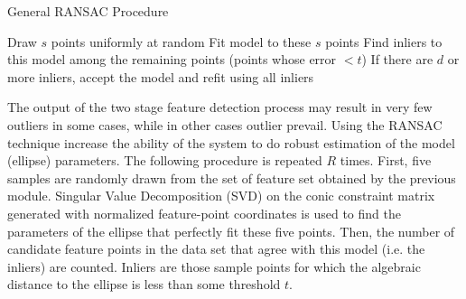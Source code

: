 \begin{algorithm}
\begin{dBox}
	\caption{General RANSAC Procedure} \label{ransac_outline}
	\begin{algorithmic}[1]
			\State Draw $s$ points uniformly at random
			\State Fit model to these $s$ points
			\State Find inliers to this model among the remaining points (points whose error $ < t$)
			\State If there are $d$ or more inliers, accept the model and refit using all inliers	
		\EndWhile	
		\EndProcedure	
	\end{algorithmic}
\end{dBox}	
\end{algorithm}


The output of the two stage feature detection process may result in very few outliers in some cases, while in other cases outlier prevail. Using the RANSAC technique increase the ability of the system to do robust estimation of the model (ellipse) parameters. The following procedure is repeated $R$ times. First, five samples are randomly drawn from the set of feature set obtained by the previous module.  Singular Value Decomposition (SVD) on the conic constraint matrix generated with normalized feature-point coordinates \cite{multipleViewGeom} is used to find the parameters of the ellipse that perfectly fit these five points. Then, the number of candidate feature points in the data set that agree with this model (i.e. the inliers) are counted. Inliers are those sample points for which the algebraic distance to the ellipse is less than some threshold $t$. \bigskip

